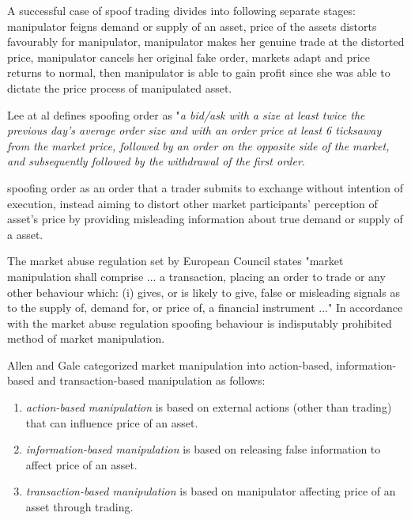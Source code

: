 \documentclass{tut-thesis}
\begin{document}
A successful case of spoof trading divides into following separate stages: manipulator feigns demand or supply of an asset, price of the assets distorts favourably for manipulator, manipulator makes her genuine trade at the distorted price, manipulator cancels her original fake order, markets adapt and price returns to normal, then manipulator is able to gain profit since she was able to dictate the price process of manipulated asset.

Lee at al \parencite*{} defines spoofing order as "\textit{a bid/ask with a size at least twice the previous day’s average order size and with an order price at least 6 ticks\footnotemark away from the market price, followed by an order on the opposite side of the market, and subsequently followed by the withdrawal of the first order}.


spoofing order as an order that a trader submits to exchange without intention of execution, instead aiming to distort other market participants' perception of asset's price by providing misleading information about true demand or supply of a asset. 


The market abuse regulation set by European Council states "market manipulation shall comprise ... a transaction, placing an order to trade or any other behaviour which: (i) gives, or is likely to give, false or misleading signals as to the supply of, demand for, or price of, a financial instrument ..." \autocite{EU-596-2014} In accordance with the market abuse regulation spoofing behaviour is indisputably prohibited method of market manipulation.

Allen and Gale categorized market manipulation into action-based, information-based and transaction-based manipulation as follows:
\begin{enumerate}
	\item \textit{action-based manipulation} is based on external actions (other than trading) that can influence price of an asset.
	\item \textit{information-based manipulation} is based on releasing false information to affect price of an asset.
	\item \textit{transaction-based manipulation}	is based on manipulator affecting price of an asset through trading.\autocite*{AllenGale1992}
\end{enumerate}
\end{document}
